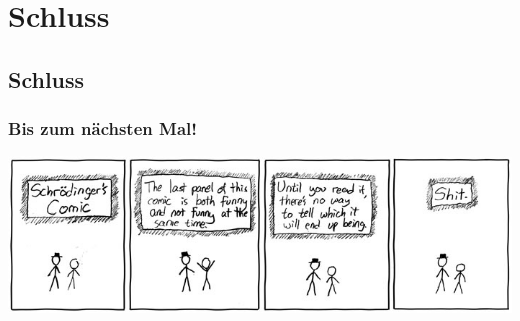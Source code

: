 \section{Schluss}
\subsection{Schluss}

\begin{frame}
\frametitle{Bis zum nächsten Mal!}
\begin{center}
  \includegraphics[width=1.5 \textheight]{images/schrodinger.jpg}
\end{center}
\end{frame}

